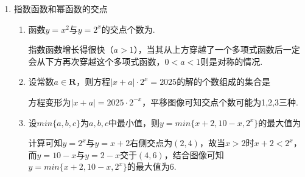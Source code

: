 \begin{enumerate}
\begin{enumerate}
        \item 已知$1<x<2$, 则$a=2^x$, $b=\sqrt[3]{x}$, $c=\log_{\frac{1}{2}}x$的大小关系是.
        \item 如果$\log_a2>\log_b2$, 那么$a,b$间的关系是\dotfill() 
        {$1>b>a>0$}
        {$a>1$且$0<b<1$}
        {以上三种答案均有可能}
        \begin{jieda}
        \begin{enumerate}
            \item 方法1 \\
            通过换底公式可以转化为$\dfrac{\lg2}{\lg{a}}>\dfrac{\lg2}{\lg{b}}$，即$\dfrac{1}{\lg{a}}>\dfrac{1}{\lg{b}}$，因此三种可能均可满足要求.
            \item 方法2 \\
            结合图像可以判断出三种可能均满足要求 \\
            \ps 对于指数函数$y = a^x$，当$a > 1$时，$a$越大，函数图像增长越快，越贴近$y$轴；当$1 > a > 0$时，$\dfrac{1}{a}$越大，函数图像下降越快，越贴近$y$轴；\\
            对于对数函数$y = log_ax$，当$a > 1$时，$a$越大，函数图像增长越慢，越贴近$x$轴；当$1 > a > 0$时，$\dfrac{1}{a}$越大，函数图像下降越慢，越贴近$y$轴；
        \end{enumerate}
        \end{jieda}
    \end{enumerate}
    \item 指数函数和幂函数的交点
    \begin{enumerate}
        \item 函数$y = x^2$与$y = 2^x$的交点个数为. 
        \begin{jieda}
            指数函数增长得很快（$a > 1$），当其从上方穿越了一个多项式函数后一定会从下方再次穿越这个多项式函数，$0 < a < 1$则是对称的情况.
        \end{jieda}
        \item 设常数$a \in \mathbf{R}$，则方程$|x+a| \cdot 2^x = 2025$的解的个数组成的集合是
        \begin{jieda}
            方程变形为$|x+a| = 2025 \cdot 2^{-x}$，平移图像可知交点个数可能为1,2,3三种.
        \end{jieda}
        \item 设$min\{a, b, c\}$为$a, b, c$中最小值，则$y = min\{x+2, 10-x, 2^x\}$的最大值为
        \begin{jieda}
            计算可知$y = 2^x$与$y = x+2$右侧交点为$(2, 4)$，故当$x > 2$时$x+2 < 2^x$，而$y = 10-x$与$y = 2-x$交于$(4, 6)$，结合图像可知$y = min\{x+2, 10-x, 2^x\}$的最大值为6.

\end{jieda}
\end{enumerate}
\end{enumerate}
